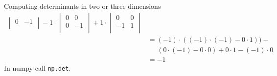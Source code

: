 \documentclass[notes]{beamer}
\begin{document}
\begin{frame}{Computing determinants in two or three dimensions}
{\begin{align}
\begin{vmatrix}
         0 & -1 \\
       \end{vmatrix}  
       -
       1 \cdot
       \begin{vmatrix}
        0 & 0  \\
        0 & -1 \\
       \end{vmatrix}  
      +
       1 \cdot
       \begin{vmatrix}
        0 & 0  \\
        -1 & 1  \\
       \end{vmatrix}  \\
       &= (-1) \cdot ((-1) \cdot (-1) - 0 \cdot 1)) - \\
       &\;\;\;\;\;  (0 \cdot (-1) - 0 \cdot 0) + 0 \cdot 1 -(-1) \cdot 0 \\
       &= -1
      \end{align}
      In numpy call \texttt{np.det}.
    }
    \end{frame}
\end{document}
